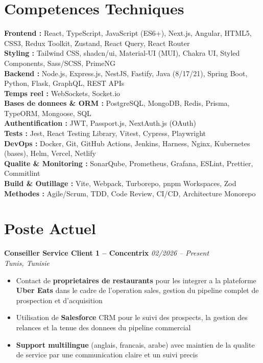 \documentclass[10pt,a4paper]{article}
\begin{document}
\section*{Competences Techniques}
{\small
\textbf{Frontend :} React, TypeScript, JavaScript (ES6+), Next.js, Angular, HTML5, CSS3, Redux Toolkit, Zustand, React Query, React Router\\[2pt]
\textbf{Styling :} Tailwind CSS, shadcn/ui, Material-UI (MUI), Chakra UI, Styled Components, Sass/SCSS, PrimeNG\\[2pt]
\textbf{Backend :} Node.js, Express.js, NestJS, Fastify, Java (8/17/21), Spring Boot, Python, Flask, GraphQL, REST APIs\\[2pt]
\textbf{Temps reel :} WebSockets, Socket.io\\[2pt]
\textbf{Bases de donnees \& ORM :} PostgreSQL, MongoDB, Redis, Prisma, TypeORM, Mongoose, SQL\\[2pt]
\textbf{Authentification :} JWT, Passport.js, NextAuth.js (OAuth)\\[2pt]
\textbf{Tests :} Jest, React Testing Library, Vitest, Cypress, Playwright\\[2pt]
\textbf{DevOps :} Docker, Git, GitHub Actions, Jenkins, Harness, Nginx, Kubernetes (bases), Helm, Vercel, Netlify\\[2pt]
\textbf{Qualite \& Monitoring :} SonarQube, Prometheus, Grafana, ESLint, Prettier, Commitlint\\[2pt]
\textbf{Build \& Outillage :} Vite, Webpack, Turborepo, pnpm Workspaces, Zod\\[2pt]
\textbf{Methodes :} Agile/Scrum, TDD, Code Review, CI/CD, Architecture Monorepo
}

\section*{Poste Actuel}
{\small
\textbf{Conseiller Service Client 1 -- Concentrix} \hfill \textit{02/2026 -- Present}\\[1pt]
\textit{Tunis, Tunisie}
\begin{itemize}
  \item Contact de \textbf{proprietaires de restaurants} pour les integrer a la plateforme \textbf{Uber Eats} dans le cadre de l'operation sales, gestion du pipeline complet de prospection et d'acquisition
  \item Utilisation de \textbf{Salesforce} CRM pour le suivi des prospects, la gestion des relances et la tenue des donnees du pipeline commercial
  \item \textbf{Support multilingue} (anglais, francais, arabe) avec maintien de la qualite de service par une communication claire et un suivi precis
\end{itemize}
}
\end{document}
